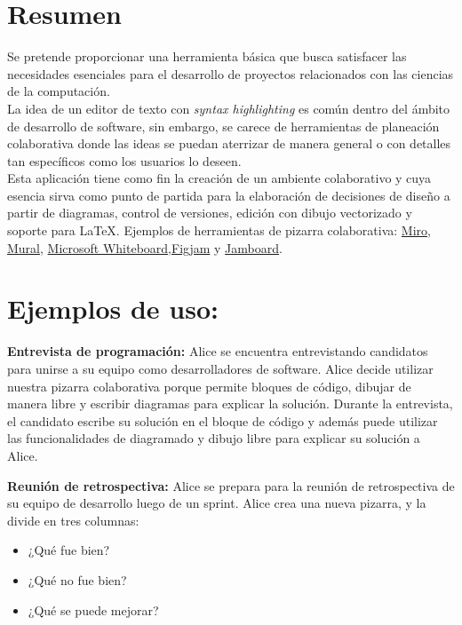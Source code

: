\documentclass[a4paper, oneside, final]{scrartcl}
\begin{document}


\section{Resumen}

Se pretende proporcionar una herramienta básica que busca satisfacer las
necesidades esenciales para el desarrollo de proyectos relacionados con las ciencias de la computación.\\

La idea de un editor de texto con \textit{syntax highlighting} es común dentro
del ámbito de desarrollo de software, sin embargo, se carece de herramientas de
planeación colaborativa donde las ideas se puedan aterrizar de manera general o
con detalles tan específicos como los usuarios lo deseen.\\

Esta aplicación tiene como fin la creación de un ambiente colaborativo y cuya
esencia sirva como punto de partida para la elaboración de decisiones de diseño
a partir de diagramas, control de versiones, edición con dibujo vectorizado y
soporte para \LaTeX.
Ejemplos de herramientas de pizarra colaborativa: \href{https://miro.com/}{Miro}, \href{https://www.mural.co/}{Mural}, \href{ https://www.microsoft.com/en-us/microsoft-365/microsoft-whiteboard/digital-whiteboard-app}{Microsoft Whiteboard},\href{https://www.figma.com/figjam/}{Figjam} y \href{https://jamboard.google.com}{Jamboard}.

\section{Ejemplos de uso:}

\textbf{Entrevista de programación:} Alice se encuentra entrevistando candidatos para unirse a su equipo como
    desarrolladores de software. Alice decide utilizar nuestra pizarra colaborativa porque permite bloques de código,
    dibujar de manera libre y escribir diagramas para explicar la solución. Durante la entrevista, el candidato escribe
    su solución en el bloque de código y además puede utilizar las funcionalidades de diagramado y dibujo libre para explicar su solución a Alice.

\textbf{Reunión de retrospectiva:} Alice se prepara para la reunión de retrospectiva de su equipo de desarrollo luego de un sprint. Alice crea una nueva pizarra, y la divide en tres columnas:

\begin{itemize}
    \item ¿Qué fue bien?
    \item ¿Qué no fue bien?
    \item ¿Qué se puede mejorar?
\end{itemize}
\end{document}
